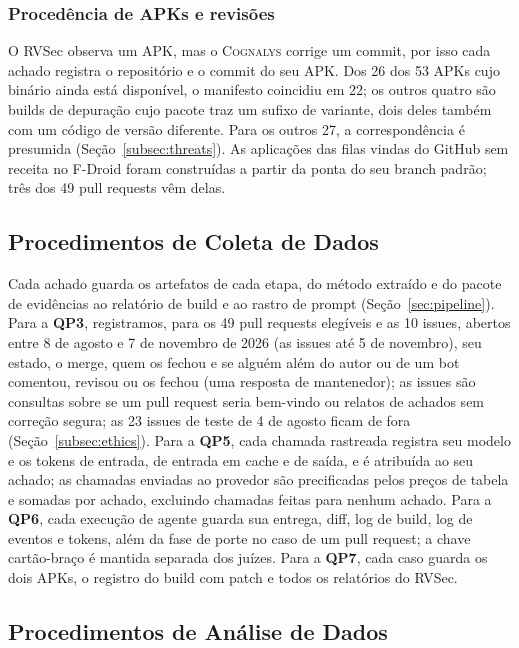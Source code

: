 \documentclass[conference]{IEEEtran}
\newcommand{\system}{\textsc{Cognalys}}
\newcommand{\researchq}[1]{\textbf{QP#1}}
\begin{document}
\subsubsection{Procedência de APKs e revisões}

O RVSec observa um APK, mas o \system{} corrige um commit, por isso cada achado
registra o repositório e o commit do seu APK. Dos 26 dos 53 APKs cujo
binário ainda está disponível, o manifesto coincidiu em 22; os outros quatro são
builds de depuração cujo pacote traz um sufixo de variante, dois deles também
com um código de versão diferente.
Para os outros 27, a correspondência é presumida
(Seção~\ref{subsec:threats}). As aplicações das filas vindas do GitHub sem
receita no F-Droid foram construídas a partir da ponta do seu branch padrão;
três dos 49 pull requests vêm delas.

\subsection{Procedimentos de Coleta de Dados}
\label{subsec:collection}


Cada achado guarda os artefatos de cada etapa, do método extraído e do pacote
de evidências ao relatório de build e ao rastro de prompt (Seção~\ref{sec:pipeline}). Para a
\researchq{3}, registramos, para os 49 pull requests elegíveis e as 10 issues,
abertos entre 8 de agosto e 7 de novembro de 2026 (as issues até 5 de novembro), seu
estado, o merge, quem os fechou
e se alguém além do autor ou de um bot comentou, revisou ou os
fechou (uma resposta de mantenedor); as issues são consultas sobre se um pull
request seria bem-vindo ou relatos de achados sem correção segura; as 23 issues
de teste de 4 de agosto ficam de fora (Seção~\ref{subsec:ethics}). Para a
\researchq{5}, cada chamada rastreada registra seu modelo e os tokens de entrada, de entrada em cache e
de saída, e é atribuída ao seu achado; as chamadas enviadas ao provedor são
precificadas pelos preços de tabela e somadas por achado, excluindo chamadas
feitas para nenhum achado. Para a \researchq{6}, cada execução de agente guarda sua entrega, diff, log de
build, log de eventos e tokens, além da fase de porte no caso de um pull request; a
chave cartão-braço é mantida separada dos juízes. Para a \researchq{7}, cada caso
guarda os dois APKs, o registro do build com patch e todos os relatórios do RVSec.

\subsection{Procedimentos de Análise de Dados}
\label{subsec:analysis}
\end{document}
